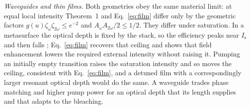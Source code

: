 \documentclass[11pt]{article}
\newcommand{\Is}{I_\mathrm{s}}
\begin{document}
\emph{Waveguides and thin films.} Both geometries obey the same material limit: at equal local intensity Theorem~1 and Eq.~\eqref{eq:film} differ only by the geometric factors $g(u)\zeta_\omega\zeta_{2\omega}\le e^{-2}$ and $A_\omega A_{2\omega}/2\le1/2$. They differ under saturation. In a metasurface the optical depth is fixed by the stack, so the efficiency peaks near $\Is$ and then falls \cite{GomezDiaz2015}; Eq.~\eqref{eq:film} recovers that ceiling and shows that field enhancement lowers the required external intensity without raising it. Pumping an initially empty transition raises the saturation intensity \cite{Nefedkin2022} and so moves the ceiling, consistent with Eq.~\eqref{eq:film}, and a detuned film with a correspondingly larger resonant optical depth would do the same. A waveguide trades phase matching and higher pump power for an optical depth that its length supplies and that adapts to the bleaching.
\end{document}
